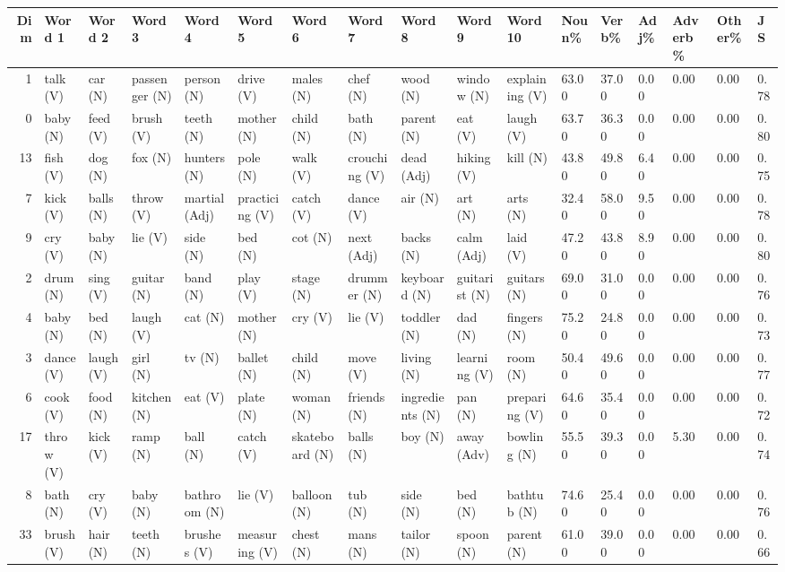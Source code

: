 \begin{tabular}{rllllllllllllllll}
\toprule
Dim & Word 1 & Word 2 & Word 3 & Word 4 & Word 5 & Word 6 & Word 7 & Word 8 & Word 9 & Word 10 & Noun\% & Verb\% & Adj\% & Adverb\% & Other\% & JS \\
\midrule
1 & talk (V) & car (N) & passenger (N) & person (N) & drive (V) & males (N) & chef (N) & wood (N) & window (N) & explaining (V) & 63.00 & 37.00 & 0.00 & 0.00 & 0.00 & 0.78 \\
0 & baby (N) & feed (V) & brush (V) & teeth (N) & mother (N) & child (N) & bath (N) & parent (N) & eat (V) & laugh (V) & 63.70 & 36.30 & 0.00 & 0.00 & 0.00 & 0.80 \\
13 & fish (V) & dog (N) & fox (N) & hunters (N) & pole (N) & walk (V) & crouching (V) & dead (Adj) & hiking (V) & kill (N) & 43.80 & 49.80 & 6.40 & 0.00 & 0.00 & 0.75 \\
7 & kick (V) & balls (N) & throw (V) & martial (Adj) & practicing (V) & catch (V) & dance (V) & air (N) & art (N) & arts (N) & 32.40 & 58.00 & 9.50 & 0.00 & 0.00 & 0.78 \\
9 & cry (V) & baby (N) & lie (V) & side (N) & bed (N) & cot (N) & next (Adj) & backs (N) & calm (Adj) & laid (V) & 47.20 & 43.80 & 8.90 & 0.00 & 0.00 & 0.80 \\
2 & drum (N) & sing (V) & guitar (N) & band (N) & play (V) & stage (N) & drummer (N) & keyboard (N) & guitarist (N) & guitars (N) & 69.00 & 31.00 & 0.00 & 0.00 & 0.00 & 0.76 \\
4 & baby (N) & bed (N) & laugh (V) & cat (N) & mother (N) & cry (V) & lie (V) & toddler (N) & dad (N) & fingers (N) & 75.20 & 24.80 & 0.00 & 0.00 & 0.00 & 0.73 \\
3 & dance (V) & laugh (V) & girl (N) & tv (N) & ballet (N) & child (N) & move (V) & living (N) & learning (V) & room (N) & 50.40 & 49.60 & 0.00 & 0.00 & 0.00 & 0.77 \\
6 & cook (V) & food (N) & kitchen (N) & eat (V) & plate (N) & woman (N) & friends (N) & ingredients (N) & pan (N) & preparing (V) & 64.60 & 35.40 & 0.00 & 0.00 & 0.00 & 0.72 \\
17 & throw (V) & kick (V) & ramp (N) & ball (N) & catch (V) & skateboard (N) & balls (N) & boy (N) & away (Adv) & bowling (N) & 55.50 & 39.30 & 0.00 & 5.30 & 0.00 & 0.74 \\
8 & bath (N) & cry (V) & baby (N) & bathroom (N) & lie (V) & balloon (N) & tub (N) & side (N) & bed (N) & bathtub (N) & 74.60 & 25.40 & 0.00 & 0.00 & 0.00 & 0.76 \\
33 & brush (V) & hair (N) & teeth (N) & brushes (V) & measuring (V) & chest (N) & mans (N) & tailor (N) & spoon (N) & parent (N) & 61.00 & 39.00 & 0.00 & 0.00 & 0.00 & 0.66 \\

\end{tabular}
